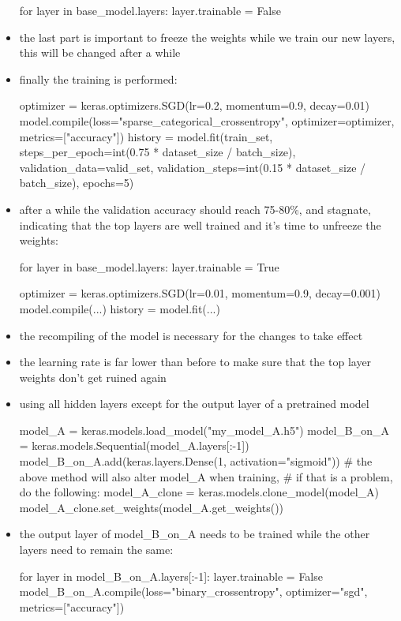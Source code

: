 \documentclass[12pt,a4paper]{article}
\begin{document}
\begin{itemize}
\begin{python}
    for layer in base_model.layers:
        layer.trainable = False
  \end{python}
  \item the last part is important to freeze the weights while we train our new layers, this will be changed after a while
  \item finally the training is performed:
  \begin{python}
    optimizer = keras.optimizers.SGD(lr=0.2, momentum=0.9, decay=0.01)
    model.compile(loss="sparse_categorical_crossentropy", 
                  optimizer=optimizer, metrics=["accuracy"])
    history = model.fit(train_set,
                steps_per_epoch=int(0.75 * dataset_size / batch_size),
                validation_data=valid_set,
                validation_steps=int(0.15 * dataset_size / batch_size),
                epochs=5)
  \end{python}
  \item after a while the validation accuracy should reach 75-80\%, and stagnate, indicating that the top layers are well trained and it's time to unfreeze the weights:
  \begin{python}
    for layer in base_model.layers:
        layer.trainable = True

    optimizer = keras.optimizers.SGD(lr=0.01, momentum=0.9, decay=0.001)
    model.compile(...)
    history = model.fit(...)
  \end{python}
  \item the recompiling of the model is necessary for the changes to take effect
  \item the learning rate is far lower than before to make sure that the top layer weights don't get ruined again
  \item using all hidden layers except for the output layer of a pretrained model
  \begin{python}
    model_A = keras.models.load_model("my_model_A.h5")
    model_B_on_A = keras.models.Sequential(model_A.layers[:-1])
    model_B_on_A.add(keras.layers.Dense(1, activation="sigmoid"))
    # the above method will also alter model_A when training, 
    # if that is a problem, do the following:
    model_A_clone = keras.models.clone_model(model_A)
    model_A_clone.set_weights(model_A.get_weights())
  \end{python}
  \item the output layer of model\_B\_on\_A needs to be trained while the other layers need to remain the same:
  \begin{python}
    for layer in model_B_on_A.layers[:-1]:
        layer.trainable = False
    model_B_on_A.compile(loss="binary_crossentropy", 
                          optimizer="sgd",
                          metrics=["accuracy"])
  \end{python}
\end{itemize}
\end{document}
